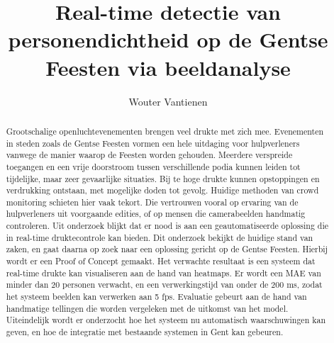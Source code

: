 \documentclass{hogent-article}
\title{Real-time detectie van personendichtheid op de Gentse Feesten via beeldanalyse}
\author{Wouter Vantienen}
\begin{document}
\begin{abstract}
   Grootschalige openluchtevenementen brengen veel drukte met zich mee. Evenementen in steden zoals de Gentse Feesten vormen een hele uitdaging voor hulpverleners vanwege de manier waarop de Feesten worden gehouden. 
   Meerdere verspreide toegangen en een vrije doorstroom tussen verschillende podia kunnen leiden tot tijdelijke, maar zeer gevaarlijke situaties. 
   Bij te hoge drukte kunnen opstoppingen en verdrukking ontstaan, met mogelijke doden tot gevolg.
   Huidige methoden van crowd monitoring schieten hier vaak tekort. Die vertrouwen vooral op ervaring van de hulpverleners uit voorgaande edities, of op mensen die camerabeelden handmatig controleren. 
   Uit onderzoek blijkt dat er nood is aan een geautomatiseerde oplossing die in real-time druktecontrole kan bieden.
   Dit onderzoek bekijkt de huidige stand van zaken, en gaat daarna op zoek naar een oplossing gericht op de Gentse Feesten.
   Hierbij wordt er een Proof of Concept gemaakt. Het verwachte resultaat is een systeem dat real-time drukte kan visualiseren aan de hand van heatmaps.
   Er wordt een MAE van minder dan 20 personen verwacht, en een verwerkingstijd van onder de 200 ms, zodat het systeem beelden kan verwerken aan 5 fps.
   Evaluatie gebeurt aan de hand van handmatige tellingen die worden vergeleken met de uitkomst van het model.
   Uiteindelijk wordt er onderzocht hoe het systeem nu automatisch waarschuwingen kan geven, en hoe de integratie met bestaande systemen in Gent kan gebeuren.
\end{abstract}

\tableofcontents



\printbibliography[heading=bibintoc]
\end{document}
